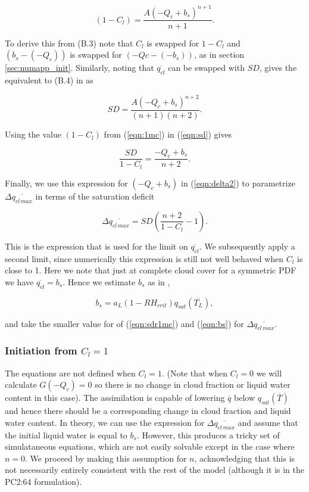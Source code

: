 \documentclass{UMDP_article}
\begin{document}
\begin{equation}
(1-C_l) = \frac{ A (-Q_c + b_s)^{n+1} }{n+1} .
\label{eqn:1mc}
\end{equation}

To derive this from (B.3) note that $C_l$ is swapped for $1-C_l$ and
$(b_s - (-Q_c))$ is swapped for $(-Qc - (-b_s))$, as in section
\ref{sec:numapp_init}. Similarly, noting that $\overline{q_{cl}}$ can be
swapped with $SD$, gives the equivalent to (B.4) in \cite{wg03} 
as

\begin{equation}
SD = \frac{ A (-Q_c + b_s)^{n+2} }{(n+1)(n+2)}.
\label{eqn:sd}
\end{equation}

Using the value $(1-C_l)$ from (\ref{eqn:1mc}) in (\ref{eqn:sd}) gives

\begin{equation}
\frac{SD}{1-C_l} = \frac {-Q_c + b_s}{n+2} .
\end{equation}

Finally, we use this expression for $(-Q_c + b_s)$ in (\ref{eqn:delta2}) to
parametrize $\Delta \overline{q_{cl \, max}}$ in terms
of the saturation deficit

\begin{equation}
\Delta \overline{q_{cl \, max}} = SD ( \frac{n+2}{1-C_l} - 1 ) .
\label{eqn:sdr1mc}
\end{equation}

This is the expression that is used for the limit on $\overline{q_{cl}}$.
We subsequently apply a second limit, since numerically this expression is
still not well behaved when $C_l$ is close to 1. Here we note that just at
complete cloud cover for a symmetric PDF we have
$\overline{q_{cl}} = b_s$. Hence we estimate $b_s$ as in \cite{smith90},

\begin{equation}
b_s = a_L ( 1 - RH_{crit} ) q_{sat}(\overline{T_L}) ,
\label{eqn:bs}
\end{equation}

and take the smaller value for
of (\ref{eqn:sdr1mc}) and (\ref{eqn:bs}) for $\Delta \overline{q_{cl \, max}}$.


\subsubsection{Initiation from $C_l=1$}
The equations are not defined when $C_l=1$. (Note that when $C_l=0$ we
will calculate $G(-Q_c)=0$ so there is no change in cloud fraction or liquid water
content in this case). The assimilation is capable of lowering $\overline{q}$
below $q_{sat}(\overline{T})$ and hence there should be a corresponding
change in cloud fraction and liquid water content. In theory, we can use
the expression for $\Delta \overline{q_{cl \, max}}$ and assume that the
initial liquid water is equal to $b_s$. However, this produces
a tricky set of simulataneous equations, which are not easily solvable
except in the case where $n=0$. We proceed by making this assumption for $n$,
acknowledging that this is not necessarily entirely consistent with the
rest of the model (although it is in the PC2:64 formulation).
\end{document}
